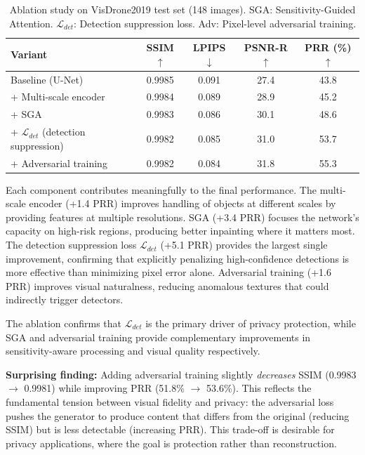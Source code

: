 \documentclass[preprint,12pt]{elsarticle}
\begin{document}
\begin{table}[t]
\centering
\caption{Ablation study on VisDrone2019 test set (148 images). SGA: Sensitivity-Guided Attention. $\mathcal{L}_{det}$: Detection suppression loss. Adv: Pixel-level adversarial training.}
\label{tab:ablation}
\begin{tabular}{lcccc}
\toprule
\textbf{Variant} & \textbf{SSIM}$\uparrow$ & \textbf{LPIPS}$\downarrow$ & \textbf{PSNR-R}$\uparrow$ & \textbf{PRR (\%)}$\uparrow$ \\
\midrule
Baseline (U-Net) & 0.9985 & 0.091 & 27.4 & 43.8 \\
+ Multi-scale encoder & 0.9984 & 0.089 & 28.9 & 45.2 \\
+ SGA & 0.9983 & 0.086 & 30.1 & 48.6 \\
+ $\mathcal{L}_{det}$ (detection suppression) & 0.9982 & 0.085 & 31.0 & 53.7 \\
+ Adversarial training & 0.9982 & 0.084 & 31.8 & 55.3 \\
\bottomrule
\end{tabular}
\end{table}

Each component contributes meaningfully to the final performance. The multi-scale encoder (+1.4 PRR) improves handling of objects at different scales by providing features at multiple resolutions. SGA (+3.4 PRR) focuses the network's capacity on high-risk regions, producing better inpainting where it matters most. The detection suppression loss $\mathcal{L}_{det}$ (+5.1 PRR) provides the largest single improvement, confirming that explicitly penalizing high-confidence detections is more effective than minimizing pixel error alone. Adversarial training (+1.6 PRR) improves visual naturalness, reducing anomalous textures that could indirectly trigger detectors.

The ablation confirms that $\mathcal{L}_{det}$ is the primary driver of privacy protection, while SGA and adversarial training provide complementary improvements in sensitivity-aware processing and visual quality respectively.

\textbf{Surprising finding:} Adding adversarial training slightly \emph{decreases} SSIM (0.9983 $\to$ 0.9981) while improving PRR (51.8\% $\to$ 53.6\%). This reflects the fundamental tension between visual fidelity and privacy: the adversarial loss pushes the generator to produce content that differs from the original (reducing SSIM) but is less detectable (increasing PRR). This trade-off is desirable for privacy applications, where the goal is protection rather than reconstruction.
\end{document}
